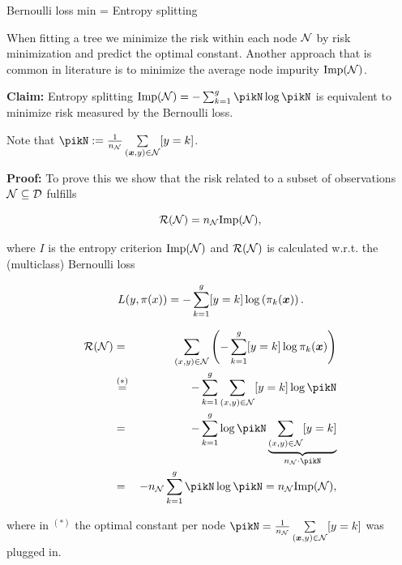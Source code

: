 \begin{vbframe}{Bernoulli loss min = Entropy splitting}

When fitting a tree we minimize the risk within each node $\mathcal{N}$ by risk minimization and predict the optimal constant. Another approach that is common in literature is to minimize the average node impurity $\text{Imp}(\mathcal{N})$. 

\vspace*{0.2cm}

\textbf{Claim:} Entropy splitting $\text{Imp}(\Np) = -\sum_{k = 1}^g \pikN \log \pikN$ is equivalent to minimize risk measured by the Bernoulli loss. 

\begin{footnotesize}
Note that $\pikN := \frac{1}{n_{\Np}} \sum\limits_{(\xv,y) \in \Np} [y = k]$. 
\end{footnotesize}

\vspace*{0.2cm}

\textbf{Proof: } To prove this we show that the risk related to a subset of observations $\mathcal{N} \subseteq \mathcal{D}$ fulfills 

\vspace*{- 0.2cm}


$$
  \mathcal{R}(\mathcal{N}) = n_{\mathcal{N}} \text{Imp}(\mathcal{N}),
$$
  
  where $I$ is the entropy criterion $\text{Imp}(\mathcal{N})$ and $\mathcal{R}(\mathcal{N})$ is calculated w.r.t. the (multiclass) Bernoulli loss  

$$
  L(y, \pi(x)) = -\sum_{k = 1}^g [y = k] \log \left(\pi_k(\bm{x})\right).
$$

\framebreak 
\begin{footnotesize}
\begin{eqnarray*}
\risk(\Np) &=& \sum_{\xy \in \Np} \left(- \sum_{k = 1}^g [y = k] \log \pi_k(\xv) \right) \\
&\overset{(*)}{=}& -\sum_{k = 1}^g \sum_{\xy \in \Np} [y = k]\log \pikN \\
&=& -\sum_{k = 1}^g \log \pikN \underbrace{\sum_{\xy \in \Np} [y = k]}_{n_{\Np}\cdot \pikN } \\
 &=& -n_{\Np} \sum_{k = 1}^g \pikN \log \pikN = n_\Np \text{Imp}(\Np), 
\end{eqnarray*} 

where in $^{(*)}$ the optimal constant per node $\pikN = \frac{1}{n_{\Np}} \sum\limits_{(\xv,y) \in \Np} [y = k]$ was plugged in. 
\end{footnotesize}



\end{vbframe}
